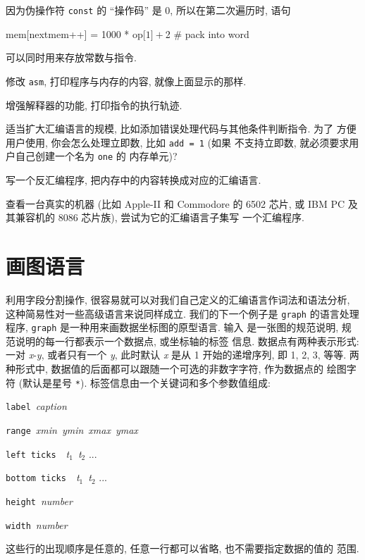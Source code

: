 因为伪操作符 \texttt{const} 的 ``操作码'' 是 0, 所以在第二次遍历时, 语句
\begin{awkcode}
    mem[nextmem++] = 1000 * op[$1] + $2  # pack into word
\end{awkcode}
可以同时用来存放常数与指令.

\begin{exercise}
    \label{exer:asm}
    修改 \texttt{asm}, 打印程序与内存的内容, 就像上面显示的那样.
\end{exercise}

\begin{exercise}
    增强解释器的功能, 打印指令的执行轨迹.
\end{exercise}

\begin{exercise}
    适当扩大汇编语言的规模, 比如添加错误处理代码与其他条件判断指令. 为了 
    方便用户使用, 你会怎么处理立即数, 比如 \texttt{add = 1} (如果 
    不支持立即数, 就必须要求用户自己创建一个名为 \texttt{one} 的
    内存单元)?
\end{exercise}

\begin{exercise}
    写一个反汇编程序, 把内存中的内容转换成对应的汇编语言.
\end{exercise}

\begin{exercise}
    查看一台真实的机器 (比如 Apple-II 和 Commodore 的 6502 芯片, 或
    IBM PC 及其兼容机的 8086 芯片族), 尝试为它的汇编语言子集写
    一个汇编程序.
\end{exercise}

\section{画图语言}
\label{sec:a_language_for_drawing_graphs}

利用字段分割操作, 很容易就可以对我们自己定义的汇编语言作词法和语法分析,
这种简易性对一些高级语言来说同样成立. 我们的下一个例子是 \texttt{graph} 
的语言处理程序, \texttt{graph} 是一种用来画数据坐标图的原型语言. 输入
是一张图的规范说明, 规范说明的每一行都表示一个数据点, 或坐标轴的标签
信息. 数据点有两种表示形式: 一对 \textit{x}-\textit{y}, 或者只有一个
\textit{y}, 此时默认 \textit{x} 是从 1 开始的递增序列, 即 1, 2, 3, 等等.
两种形式中, 数据值的后面都可以跟随一个可选的非数字字符, 作为数据点的
绘图字符 (默认是星号 \verb'*').  标签信息由一个关键词和多个参数值组成:
\begin{pattern}
\indent\texttt{label}\ \textit{caption} \par
\indent\texttt{range}\ \textit{xmin}\ \textit{ymin}\ \textit{xmax}\
    \textit{ymax} \par 
\indent\texttt{left ticks}\ \ \textit{t}$_1$\ \textit{t}$_2$ ... \par 
\indent\texttt{bottom ticks}\ \ \textit{t}$_1$\ \textit{t}$_2$ ... \par 
\indent\texttt{height}\ \textit{number}\par
\indent\texttt{width}\ \textit{number}\par
\end{pattern}
这些行的出现顺序是任意的, 任意一行都可以省略, 也不需要指定数据的值的
范围.

